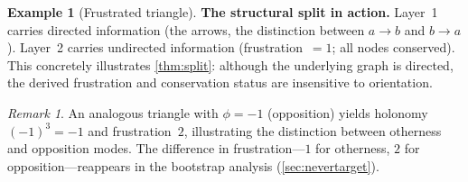 \documentclass[11pt,a4paper]{article}
\theoremstyle{definition}
\newtheorem{example}[definition]{Example}
\theoremstyle{plain}
\theoremstyle{remark}
\newtheorem{remark}[definition]{Remark}
\begin{document}
\begin{example}[Frustrated triangle]
  \medskip
  \noindent\textbf{The structural split in action.}  Layer~1 carries directed information (the arrows, the distinction between $a \to b$ and $b \to a$).  Layer~2 carries undirected information (frustration~$= 1$; all nodes conserved).  This concretely illustrates \cref{thm:split}: although the underlying graph is directed, the derived frustration and conservation status are insensitive to orientation.
\end{example}

\begin{remark}
  An analogous triangle with $\phi = -1$ (opposition) yields holonomy $(-1)^3 = -1$ and frustration~$2$, illustrating the distinction between otherness and opposition modes.  The difference in frustration---$1$ for otherness, $2$ for opposition---reappears in the bootstrap analysis (\cref{sec:nevertarget}).
\end{remark}
\end{document}
